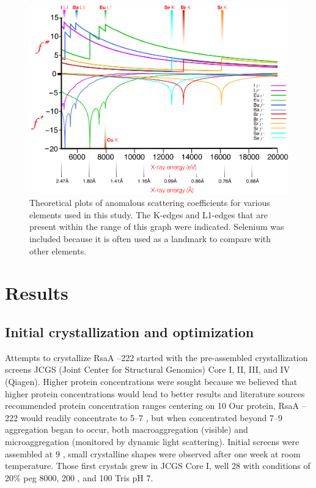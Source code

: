 \begin{figure}[p]
  	\begin{center}
   		\includegraphics[width=\textwidth]{crystal_chapter/img/edgeplots.pdf}
   	\end{center}
   	\caption[Edge plots for useful anomalous dispersion elements]{
   	Theoretical plots of anomalous scattering coefficients for various elements used in this study. The K-edges and L1-edges that are present within the range of this graph were indicated. Selenium was included because it is often used as a landmark to compare with other elements.}
   	\label{fig:edges}
\end{figure}    

\section{Results}\label{sec:crystal-results}

\subsection{Initial crystallization and optimization}\label{sec:init-cryst-optim} 
 Attempts to crystallize RsaA --222 started with the pre-assembled crystallization screens JCGS (Joint Center for Structural Genomics) Core I, II, III, and IV (Qiagen). Higher protein concentrations were sought because we believed that higher protein concentrations would lead to better results and literature sources recommended protein concentration ranges centering on 10 \mgperml{} Our protein, RsaA --222 would readily concentrate to 5--7 \mgperml, but when concentrated beyond 7--9 \mgperml aggregation began to occur, both macroaggregation (visible) and microaggregation (monitored by dynamic light scattering). Initial screens were assembled at 9 \mgperml, small crystalline shapes were observed after one week at room temperature. Those first crystals grew in JCGS Core I, well 28 with conditions of 20\% \ac{peg} 8000, 200 \millimolar {}, and 100 \millimolar Tris pH 7.
 
